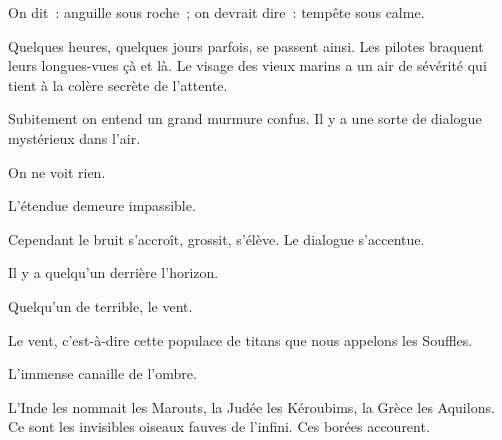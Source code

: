 \documentclass[french,twoside]{book} %
\begin{document}
On dit : anguille sous roche ; on devrait dire : tempête sous calme.\par
Quelques heures, quelques jours parfois, se passent ainsi. Les pilotes braquent leurs longues-vues çà et là. Le visage des vieux marins a un air de sévérité qui tient à la colère secrète de l’attente.\par
 Subitement on entend un grand murmure confus. Il y a une sorte de dialogue mystérieux dans l’air.\par
On ne voit rien.\par
L’étendue demeure impassible.\par
Cependant le bruit s’accroît, grossit, s’élève. Le dialogue s’accentue.\par
Il y a quelqu’un derrière l’horizon.\par
Quelqu’un de terrible, le vent.\par
Le vent, c’est-à-dire cette populace de titans que nous appelons les Souffles.\par
L’immense canaille de l’ombre.\par
L’Inde les nommait les Marouts, la Judée les Kéroubims, la Grèce les Aquilons. Ce sont les invisibles oiseaux fauves de l’infini. Ces borées accourent.
\end{document}
